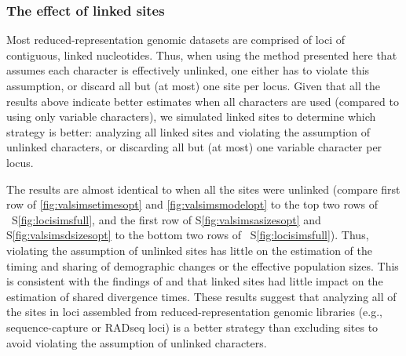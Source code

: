 \ifembed{

}{}


\subsubsection{The effect of linked sites}

Most reduced-representation genomic datasets are comprised of loci of
contiguous, linked nucleotides.
Thus, when using the method presented here that assumes each character is
effectively unlinked,
one either has to violate this assumption, or discard all but (at most) one
site per locus.
Given that all the results above indicate better estimates when all
characters are used (compared to using only variable characters), we
simulated linked sites to determine which strategy is better:
analyzing all linked sites and violating the assumption of unlinked characters,
or discarding all but (at most) one variable character per locus.

The results are almost identical to when all the sites were unlinked
(compare first row of
\figs
\ref{fig:valsimsetimesopt}
and
\ref{fig:valsimsmodelopt}
to the top two rows of
\fig{}~S\ref{fig:locisimsfull},
and the first row of
\figs
S\ref{fig:valsimsasizesopt}
and
S\ref{fig:valsimsdsizesopt}
to the bottom two rows of
\fig{}~S\ref{fig:locisimsfull}).
Thus, violating the assumption of unlinked sites has little
 on the estimation of the timing and sharing of
demographic changes or the effective population sizes.
This is consistent with the findings of
\citet{Oaks2018ecoevolity} and
\citet{Oaks2018paic}
that linked sites had little impact on the estimation of
shared divergence times.
These results suggest that analyzing all of the sites in loci assembled from
reduced-representation genomic libraries (e.g., sequence-capture or RADseq
loci) is a better strategy than excluding sites to avoid violating the
assumption of unlinked characters.

